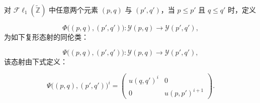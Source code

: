 对 $\mathcal{F}\ell_1(\widetilde{\mathbb Z})$ 中任意两个元素 $(p,q)$ 与
$(p',q')$，当 $p\leq p'$ 且 $q\leq q'$ 时，定义

\begin{equation}
\Phi\bigl((p,q),(p',q')\bigr)\colon
\mathcal Y(p,q)\longrightarrow\mathcal Y(p',q'),
\tag{4.1.1.3}
\end{equation}
为如下复形态射的同伦类：

\begin{equation}
\Psi\bigl((p,q),(p',q')\bigr)\colon
\mathcal Y(p,q)\longrightarrow\mathcal Y(p',q'),
\tag{4.1.1.4}
\end{equation}
该态射由下式定义：

\begin{equation}
\Psi\bigl((p,q),(p',q')\bigr)^i
=
\begin{pmatrix}
u(q,q')^i & 0\\
0 & u(p,p')^{i+1}
\end{pmatrix}.
\tag{4.1.1.5}
\end{equation}
\endgroup
